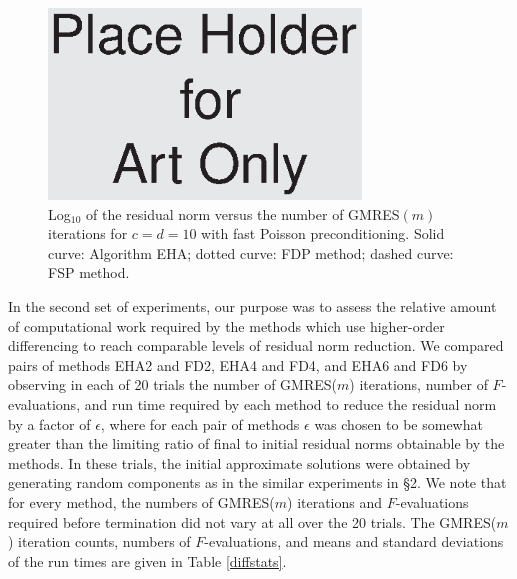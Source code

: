 \documentclass{SIAMGHbook2016}
\def\e{{\epsilon}}
\def\gmresm{{\rm GMRES($m$)}}
\begin{document}
\begin{figure}
\centerline{\includegraphics[height=2in]{box.eps}}
\caption{{\rm Log}$_{10}$ of the residual norm versus the number of
{\rm GMRES}$(m)$ iterations for $c=d=10$ with fast Poisson
preconditioning. Solid curve: Algorithm {\rm EHA}; dotted
curve: {\rm FDP} method; dashed curve: {\rm FSP} method.}
\label{pdep}
\end{figure}


In the second set of experiments, our purpose was to assess the
relative amount of computational work required by the methods
which use higher-order differencing to reach comparable levels
of residual norm reduction. We compared pairs of methods EHA2
and FD2, EHA4 and FD4, and EHA6 and FD6 by observing in each of
20 trials the number of {\gmresm} iterations, number of $F$-evaluations,
and run time required by each method to reduce the residual norm
by a factor of $\e$, where for each pair of methods $\e$ was chosen
to be somewhat greater than the limiting ratio of final to
initial residual norms obtainable by the methods. In these trials,
the initial approximate solutions were obtained by generating random
components as in the similar experiments in \S2. We note that for every
method, the numbers of {\gmresm} iterations and $F$-evaluations required
before termination did not vary at all over the 20 trials. The {\gmresm}
iteration counts, numbers of $F$-evaluations, and means and standard
deviations of the run times are given in Table \ref{diffstats}.
\end{document}
